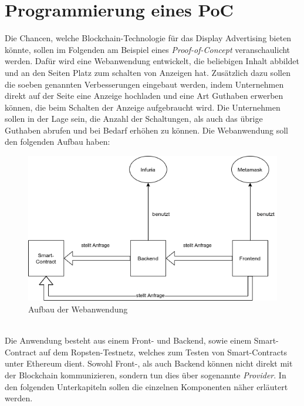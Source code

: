 \section{Programmierung eines PoC}
Die Chancen, welche Blockchain-Technologie für das Display Advertising bieten könnte, sollen im Folgenden am Beispiel eines \emph{Proof-of-Concept} veranschaulicht werden. 
Dafür wird eine Webanwendung entwickelt, die beliebigen Inhalt abbildet und an den Seiten Platz zum schalten von Anzeigen hat. 
Zusätzlich dazu sollen die soeben genannten Verbesserungen eingebaut werden, indem Unternehmen direkt auf der Seite eine Anzeige hochladen und eine Art Guthaben erwerben können, die beim Schalten der Anzeige aufgebraucht wird. Die Unternehmen sollen in der Lage sein, die Anzahl der Schaltungen, als auch das übrige Guthaben abrufen und bei Bedarf erhöhen zu können. Die Webanwendung soll den folgenden Aufbau haben:
\begin{figure}[htpb]
	\centering
	\includegraphics[width=\textwidth]{images/aufbau_PoC.png}
	\caption{Aufbau der Webanwendung}
	\label{6braun:fig:aufbau_poc}
\end{figure}\\
Die Anwendung besteht aus einem Front- und Backend, sowie einem Smart-Contract auf dem Ropsten-Testnetz, welches zum Testen von Smart-Contracts unter Ethereum dient. Sowohl Front-, als auch Backend können nicht direkt mit der Blockchain kommunizieren, sondern tun dies über sogenannte \emph{Provider}. In den folgenden Unterkapiteln sollen die einzelnen Komponenten näher erläutert werden.
